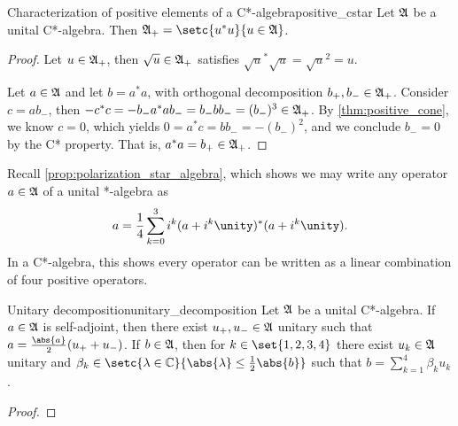 \begin{theorem}{Characterization of positive elements of a C*-algebra}{positive_cstar}
    Let \(\mathfrak{A}\) be a unital C*-algebra. Then \(\algebra{A}_+ = \setc{u^*u}{u \in \algebra{A}}\).
\end{theorem}
\begin{proof}
    Let \(u \in \mathfrak{A}_+\), then \(\sqrt{u} \in\mathfrak{A}_+\) satisfies \(\sqrt{u}^* \sqrt{u} = \sqrt{u}^2 = u\).

    Let \(a \in \mathfrak{A}\) and let \(b = a^*a\), with orthogonal decomposition \(b_+, b_- \in \mathfrak{A}_+\). Consider \(c = ab_-\), then \(- c^*c = - b_- a^* a b_- = b_-bb_- = (b_-)^3 \in \mathfrak{A}_+\). By \cref{thm:positive_cone}, we know \(c = 0\), which yields \(0 = a^*c = b b_- = -(b_-)^2\), and we conclude \(b_- = 0\) by the C* property. That is, \(a^*a = b_+ \in \mathfrak{A}_+\).
\end{proof}


Recall \cref{prop:polarization_star_algebra}, which shows we may write any operator \(a \in \mathfrak{A}\) of a unital *-algebra as
\begin{equation*}
    a = \frac14 \sum_{k = 0}^3 i^k(a + i^k \unity)^*(a + i^k \unity).
\end{equation*}
In a C*-algebra, this shows every operator can be written as a linear combination of four positive operators.
\begin{proposition}{Unitary decomposition}{unitary_decomposition}
    Let \(\mathfrak{A}\) be a unital C*-algebra. If \(a \in \mathfrak{A}\) is self-adjoint, then there exist \(u_+, u_- \in \mathfrak{A}\) unitary such that \(a = \frac{\abs{a}}{2}(u_+ + u_-)\). If \(b \in \mathfrak{A}\), then for \(k \in \set{1,2,3,4}\) there exist \(u_k \in \mathfrak{A}\) unitary and \(\beta_k \in \setc{\lambda \in \mathbb{C}}{\abs{\lambda} \leq \frac12 \abs{b}}\) such that \(b = \sum_{k = 1}^4 \beta_k u_k\).
\end{proposition}
\begin{proof}
\todo
\end{proof}
